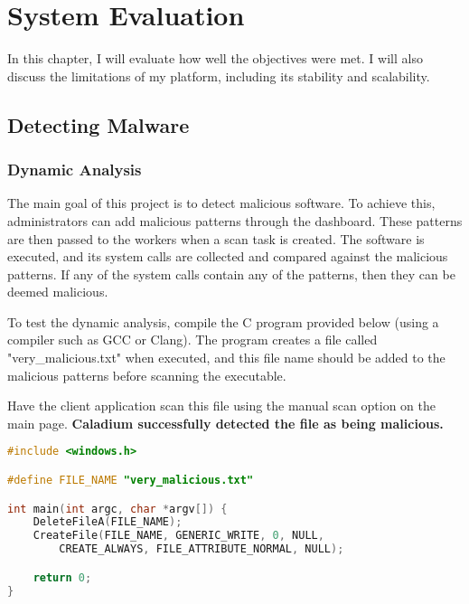 \chapter{System Evaluation}

In this chapter, I will evaluate how well the objectives were met.
I will also discuss the limitations of my platform,
including its stability and scalability.

\section{Detecting Malware}
\subsection{Dynamic Analysis}
The main goal of this project is to detect malicious software.
To achieve this, administrators can add malicious patterns through the dashboard.
These patterns are then passed to the workers when a scan task is created.
The software is executed, and its system calls are collected
and compared against the malicious patterns.
If any of the system calls contain any of the patterns,
then they can be deemed malicious.

To test the dynamic analysis, compile the C program provided below
(using a compiler such as GCC or Clang).
The program creates a file called "very\_malicious.txt" when executed,
and this file name should be added to the malicious patterns
before scanning the executable.

Have the client application scan this file using
the manual scan option on the main page.
\textbf{Caladium successfully detected the file as being malicious.}

\begin{lstlisting}[language=C]
#include <windows.h>

#define FILE_NAME "very_malicious.txt"

int main(int argc, char *argv[]) {
    DeleteFileA(FILE_NAME);
    CreateFile(FILE_NAME, GENERIC_WRITE, 0, NULL,
        CREATE_ALWAYS, FILE_ATTRIBUTE_NORMAL, NULL);

    return 0;
}
\end{lstlisting}


